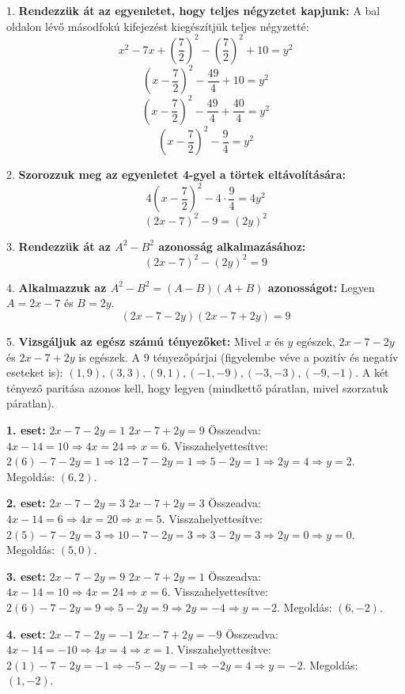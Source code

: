 \begin{solution}
	1.  \textbf{Rendezzük át az egyenletet, hogy teljes négyzetet kapjunk:}
	A bal oldalon lévő másodfokú kifejezést kiegészítjük teljes négyzetté:
	$$x^2 - 7x + \left(\frac{7}{2}\right)^2 - \left(\frac{7}{2}\right)^2 + 10 = y^2$$
	$$\left(x - \frac{7}{2}\right)^2 - \frac{49}{4} + 10 = y^2$$
	$$\left(x - \frac{7}{2}\right)^2 - \frac{49}{4} + \frac{40}{4} = y^2$$
	$$\left(x - \frac{7}{2}\right)^2 - \frac{9}{4} = y^2$$
	
	2.  \textbf{Szorozzuk meg az egyenletet 4-gyel a törtek eltávolítására:}
	$$4\left(x - \frac{7}{2}\right)^2 - 4 \cdot \frac{9}{4} = 4y^2$$
	$$(2x - 7)^2 - 9 = (2y)^2$$
	
	3.  \textbf{Rendezzük át az $A^2 - B^2$ azonosság alkalmazásához:}
	$$(2x - 7)^2 - (2y)^2 = 9$$
	
	4.  \textbf{Alkalmazzuk az $A^2 - B^2 = (A-B)(A+B)$ azonosságot:}
	Legyen $A = 2x - 7$ és $B = 2y$.
	$$(2x - 7 - 2y)(2x - 7 + 2y) = 9$$
	
	5.  \textbf{Vizsgáljuk az egész számú tényezőket:}
	Mivel $x$ és $y$ egészek, $2x-7-2y$ és $2x-7+2y$ is egészek. A 9 tényezőpárjai (figyelembe véve a pozitív és negatív eseteket is): $(1, 9), (3, 3), (9, 1), (-1, -9), (-3, -3), (-9, -1)$.
	A két tényező paritása azonos kell, hogy legyen (mindkettő páratlan, mivel szorzatuk páratlan).
	
	\textbf{1. eset:}
	$2x - 7 - 2y = 1$
	$2x - 7 + 2y = 9$
	Összeadva: $4x - 14 = 10 \Rightarrow 4x = 24 \Rightarrow x = 6$.
	Visszahelyettesítve: $2(6) - 7 - 2y = 1 \Rightarrow 12 - 7 - 2y = 1 \Rightarrow 5 - 2y = 1 \Rightarrow 2y = 4 \Rightarrow y = 2$.
	Megoldás: $(6, 2)$.
	
	\textbf{2. eset:}
	$2x - 7 - 2y = 3$
	$2x - 7 + 2y = 3$
	Összeadva: $4x - 14 = 6 \Rightarrow 4x = 20 \Rightarrow x = 5$.
	Visszahelyettesítve: $2(5) - 7 - 2y = 3 \Rightarrow 10 - 7 - 2y = 3 \Rightarrow 3 - 2y = 3 \Rightarrow 2y = 0 \Rightarrow y = 0$.
	Megoldás: $(5, 0)$.
	
	\textbf{3. eset:}
	$2x - 7 - 2y = 9$
	$2x - 7 + 2y = 1$
	Összeadva: $4x - 14 = 10 \Rightarrow 4x = 24 \Rightarrow x = 6$.
	Visszahelyettesítve: $2(6) - 7 - 2y = 9 \Rightarrow 5 - 2y = 9 \Rightarrow 2y = -4 \Rightarrow y = -2$.
	Megoldás: $(6, -2)$.
	
	\textbf{4. eset:}
	$2x - 7 - 2y = -1$
	$2x - 7 + 2y = -9$
	Összeadva: $4x - 14 = -10 \Rightarrow 4x = 4 \Rightarrow x = 1$.
	Visszahelyettesítve: $2(1) - 7 - 2y = -1 \Rightarrow -5 - 2y = -1 \Rightarrow -2y = 4 \Rightarrow y = -2$.
	Megoldás: $(1, -2)$.
	

\end{solution}
